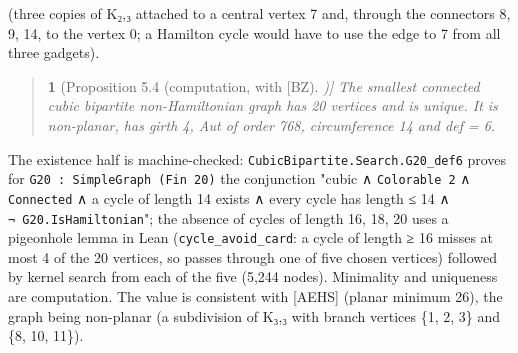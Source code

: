 \documentclass[11pt,a4paper]{article}
\theoremstyle{named}
\newtheorem*{namedthm}{}
\begin{document}
(three copies of K₂,₃ attached to a central vertex 7 and, through the connectors 8, 9, 14, to the vertex 0; a Hamilton cycle would have to use the edge to 7 from all three gadgets).

\begin{quote}
\begin{namedthm}[Proposition 5.4 (computation, with [BZ])]
The smallest connected cubic bipartite non-Hamiltonian graph has 20 vertices and is unique. It is non-planar, has girth 4, Aut of order 768, circumference 14 and def = 6.
\end{namedthm}
\end{quote}
The existence half is machine-checked: \texttt{CubicBipartite.\allowbreak{}Search.\allowbreak{}G20\_\allowbreak{}def6} proves for \texttt{G20\ \allowbreak{}:\ \allowbreak{}SimpleGraph\ \allowbreak{}(Fin\ \allowbreak{}20)} the conjunction "cubic ∧ \texttt{Colorable\ \allowbreak{}2} ∧ \texttt{Connected} ∧ a cycle of length 14 exists ∧ every cycle has length ≤ 14 ∧ \texttt{¬\ \allowbreak{}G20.\allowbreak{}IsHamiltonian}"; the absence of cycles of length 16, 18, 20 uses a pigeonhole lemma in Lean (\texttt{cycle\_\allowbreak{}avoid\_\allowbreak{}card}: a cycle of length ≥ 16 misses at most 4 of the 20 vertices, so passes through one of five chosen vertices) followed by kernel search from each of the five (5,244 nodes). Minimality and uniqueness are computation. The value is consistent with [AEHS] (planar minimum 26), the graph being non-planar (a subdivision of K₃,₃ with branch vertices \{1, 2, 3\} and \{8, 10, 11\}).
\end{document}
